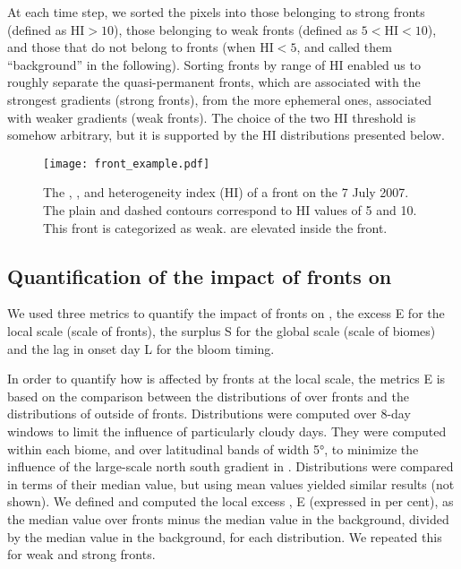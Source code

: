 At each time step, we sorted the pixels into those belonging to strong fronts (defined as \(\mathrm{HI} > 10\)), those belonging to weak fronts (defined as \(5 < \mathrm{HI} < 10\)), and those that do not belong to fronts (when \(\mathrm{HI} < 5\), and called them ``background'' in the following).
Sorting fronts by range of HI enabled us to roughly separate the quasi-permanent fronts, which are associated with the strongest  gradients (strong fronts), from the more ephemeral ones, associated with weaker gradients (weak fronts).
The choice of the two HI threshold is somehow arbitrary, but it is supported by the HI distributions presented below.


\begin{figure*}
  \texttt{[image: front\_example.pdf]}
  \caption{
    The , , and heterogeneity index (HI) of a front on the 7 July 2007.
    The plain and dashed contours correspond to HI values of 5 and 10.
    This front is categorized as weak.
     are elevated inside the front.
  }%
  \label{fig:zoom}
\end{figure*}

\subsection{Quantification of the impact of fronts on }

We used three metrics to quantify the impact of fronts on , the excess   E for the local scale (scale of fronts), the surplus   S for the global scale (scale of biomes) and the lag in onset day L for the bloom timing.

In order to quantify how  is affected by fronts at the local scale, the metrics E is based on the comparison between the distributions of  over fronts and the distributions of  outside of fronts.
Distributions were computed over 8-day windows to limit the influence of particularly cloudy days.
They were computed within each biome, and over latitudinal bands of width 5°, to minimize the influence of the large-scale north south gradient in .
Distributions were compared in terms of their median value, but using mean values yielded similar results (not shown).
We defined and computed the local excess , E (expressed in per cent), as the median value over fronts minus the median value in the background, divided by the median value in the background, for each distribution.
We repeated this for weak and strong fronts.

